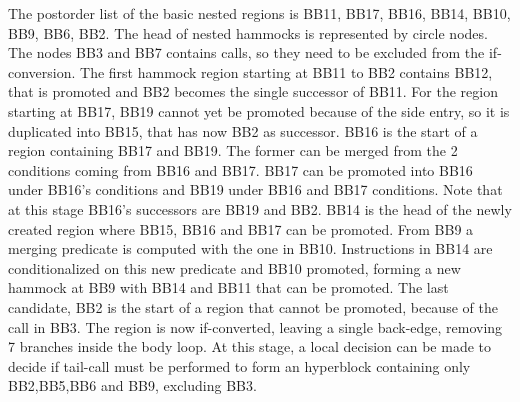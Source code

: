 The postorder list of the basic nested regions is {BB11, BB17, BB16, BB14, BB10, BB9, BB6, BB2}. The head of nested hammocks is represented by circle nodes. The nodes BB3 and BB7 contains calls, so they need to be excluded from the if-conversion.
The first hammock region starting at BB11 to BB2 contains BB12, that is promoted and BB2 becomes the single successor of BB11. 
For the region starting at BB17, BB19 cannot yet be promoted because of the side entry, so it is duplicated into BB15, that has now BB2 as successor.
BB16 is the start of a region containing BB17 and BB19. The former can be merged from the 2 conditions coming from BB16 and BB17. BB17 can be promoted into BB16 under BB16's conditions and BB19 under BB16 and BB17 conditions. Note that at this stage BB16's successors are BB19 and BB2.
BB14 is the head of the newly created region where BB15, BB16 and BB17 can be promoted. From BB9 a merging predicate is computed with the one in BB10. Instructions in BB14 are conditionalized on this new predicate and BB10 promoted, forming a new hammock at BB9 with BB14 and BB11 that can be promoted. The last candidate, BB2 is the start of a region that cannot be promoted, because of the call in BB3.
The region is now if-converted, leaving a single back-edge, removing 7 branches inside the body loop. At this stage, a local decision can be made to decide if tail-call must be performed to form an hyperblock containing only BB2,BB5,BB6 and BB9, excluding BB3. 

